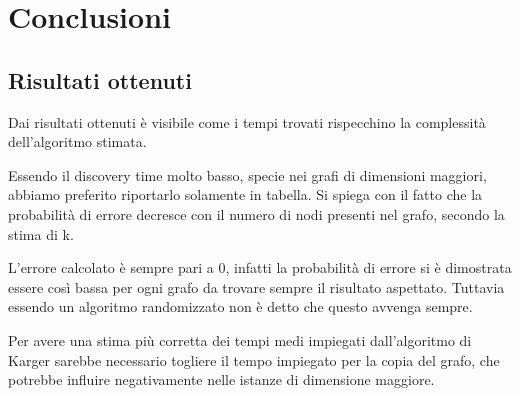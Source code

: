 \chapter{Conclusioni\label{sec:conclusioni}}

\section{Risultati ottenuti\label{sec:risultati-ottenuti}}
Dai risultati ottenuti è visibile come i tempi trovati rispecchino la complessità dell'algoritmo stimata.

Essendo il discovery time molto basso, specie nei grafi di dimensioni maggiori, abbiamo preferito riportarlo solamente in tabella.
Si spiega con il fatto che la probabilità di errore decresce con il numero di nodi presenti nel grafo, secondo la stima di k.

L'errore calcolato è sempre pari a 0, infatti la probabilità di errore si è dimostrata essere così bassa per ogni grafo da trovare sempre il risultato aspettato. Tuttavia essendo un algoritmo randomizzato non è detto che questo avvenga sempre.

Per avere una stima più corretta dei tempi medi impiegati dall'algoritmo di Karger sarebbe necessario togliere il tempo impiegato per la copia del grafo, che potrebbe influire negativamente nelle istanze di dimensione maggiore.